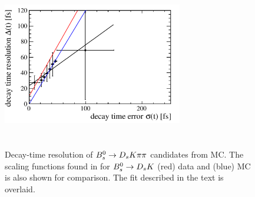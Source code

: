 \begin{figure}[h]
\includegraphics[height=7.4cm,width=0.7\textwidth]{figs/ProperTimeReso_MC.pdf}
\caption{Decay-time resolution of ${{B}^0_{s}}\rightarrow{\ensuremath{{D}_{s}}}{\ensuremath{K}}{\ensuremath{\pi}}{\ensuremath{\pi}}$ candidates from MC. 
The scaling functions found in for ${{B}^0_{s}}\rightarrow{\ensuremath{{D}_{s}}}{\ensuremath{K}}$ (red) data and (blue) MC is also shown for comparison. The fit described in the text is overlaid.}
\label{fig:ResoFit_compared}
\end{figure}



